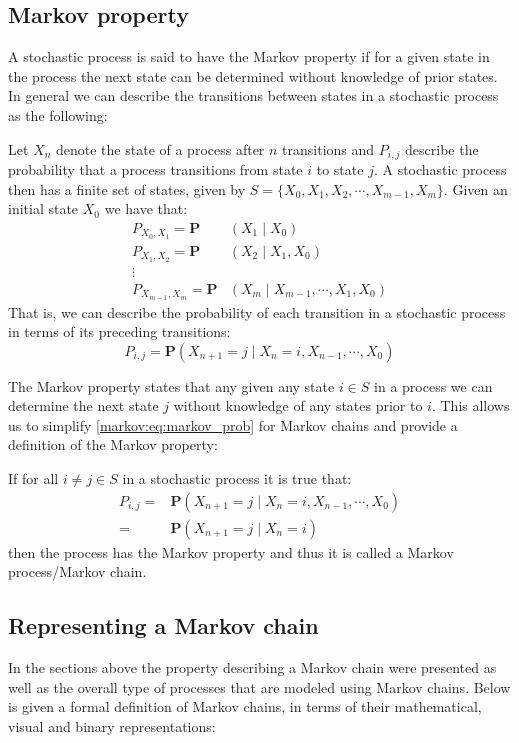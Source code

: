 \subsection{Markov property}\label{markov:property}
A stochastic process is said to have the Markov property if for a given state in the process the next state can be determined without knowledge of prior states.
In general we can describe the transitions between states in a stochastic process as the following:

Let $X_n$ denote the state of a process after $n$ transitions and $P_{i,j}$ describe the probability that a process transitions from state $i$ to state $j$.
A stochastic process then has a finite set of states, given by $S = \{X_0, X_1, X_2,\cdots, X_{m-1}, X_m\}$.
Given an initial state $X_0$ we have that:
\begin{align*}
P_{X_0,X_1} = \mathbf{P}&(X_1 \mid X_0)\\
P_{X_1,X_2} = \mathbf{P}&(X_2 \mid X_1, X_0)\\
\vdots\\
P_{X_{m-1},X_m} = \mathbf{P}&(X_m \mid X_{m-1}, \cdots, X_1, X_0)
\end{align*}
That is, we can describe the probability of each transition in a stochastic process in terms of its preceding transitions:
\begin{equation}\label{markov:eq:stochastic_prob}
P_{i,j} = \mathbf{P}(X_{n+1} = j \mid X_n = i, X_{n-1}, \cdots, X_0)
\end{equation}

The Markov property states that any given any state $i \in S$ in a process we can determine the next state $j$ without knowledge of any states prior to $i$.
This allows us to simplify \cref{markov:eq:markov_prob} for Markov chains and provide a definition of the Markov property:

If for all $i \neq j \in S$ in a stochastic process it is true that:
\begin{align}\label{markov:eq:markov_prob}
P_{i,j} = &\mathbf{P}(X_{n+1} = j \mid X_n = i, X_{n-1}, \cdots, X_0) \nonumber\\
        = &\mathbf{P}(X_{n+1} = j \mid X_n = i)
\end{align}
then the process has the Markov property and thus it is called a Markov process/Markov chain.

\subsection{Representing a Markov chain}
In the sections above the property describing a Markov chain were presented as well as the overall type of processes that are modeled using Markov chains.
Below is given a formal definition of Markov chains, in terms of their mathematical, visual and binary representations:

